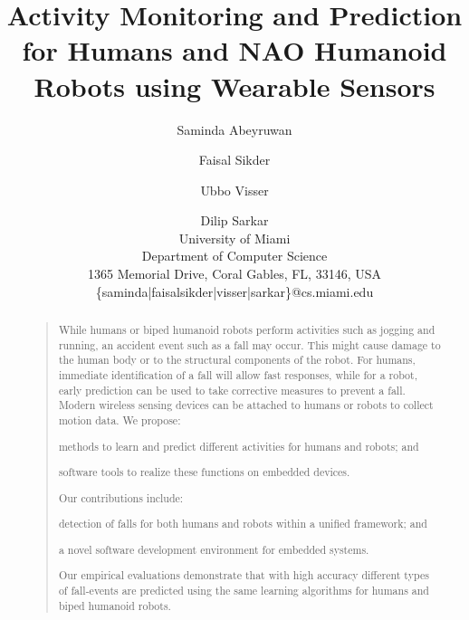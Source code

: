 \documentclass[letterpaper]{article}
\begin{document}
 \begin{sloppy}
%
\title{Activity Monitoring and Prediction for Humans and NAO Humanoid Robots using 
Wearable Sensors}
\author{Saminda Abeyruwan \and Faisal Sikder \and Ubbo Visser \and Dilip Sarkar\\
 University of Miami \\
Department of Computer Science\\
 1365 Memorial Drive, Coral Gables, FL, 33146, USA\\
{\ttfamily \{saminda|faisalsikder|visser|sarkar\}@cs.miami.edu}
}
\maketitle
\begin{abstract}
\begin{quote}
While humans or biped humanoid robots perform activities such as jogging and running, an accident 
event such as a fall may occur. This might cause damage to the human body or 
to the structural components of the robot. For humans, immediate identification of a fall 
will allow fast responses, while for a robot, early prediction can be used to take corrective 
measures to prevent a fall. Modern wireless sensing devices can be attached to humans or robots to 
collect motion data. We propose: \begin{inparaenum}[1)] \item 
methods to learn and predict different activities for humans and robots; and \item software 
tools to realize these functions  on embedded devices. \end{inparaenum} Our contributions include: 
\begin{inparaenum}[1)] \item detection of falls for both humans and robots within a unified 
framework; and \item  a  novel software development environment for embedded systems. 
\end{inparaenum} Our empirical evaluations demonstrate that with high accuracy different types of  
fall-events are predicted using the same learning algorithms for humans and biped humanoid robots. 
\end{quote}
\end{abstract}


\end{sloppy}
\end{document}
